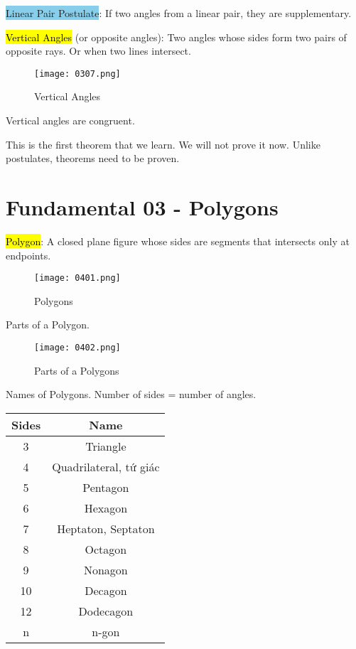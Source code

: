 \begin{tcolorbox}[colback=RoyalPurple!5!white,colframe=RoyalPurple!75!black]
  \colorbox{SkyBlue}{Linear Pair Postulate}: If two angles from a linear pair, they are supplementary.
\end{tcolorbox}

\vspace{1 cm}

\hl{Vertical Angles} (or opposite angles): Two angles whose sides form two pairs of opposite rays. Or when two lines intersect.

\begin{figure}[htb!]
  \centering
  \texttt{[image: 0307.png]}
  \caption{Vertical Angles}
\end{figure}

\begin{tcolorbox}[colback=red!5!white,colframe=red!75!black,title=Vertical Angles Theorem]
  Vertical angles are congruent.
\end{tcolorbox}

This is the first theorem that we learn. We will not prove it now. Unlike postulates, theorems need to be proven.

\section{Fundamental 03 - Polygons}

\newpage

\hl{Polygon}: A closed plane figure whose sides are segments that intersects only at endpoints.

\begin{figure}[htb!]
  \centering
  \texttt{[image: 0401.png]}
  \caption{Polygons}
\end{figure}

Parts of a Polygon.

\begin{figure}[htb!]
  \centering
  \texttt{[image: 0402.png]}
  \caption{Parts of a Polygons}
\end{figure}

\newpage

Names of Polygons. Number of sides = number of angles.

\begin{center}
\begin{tabular}{ c | c }
  \textbf{Sides} & \textbf{Name} \\
  \hline
  3 & Triangle \\
  4 & Quadrilateral, tứ giác \\
  5 & Pentagon \\
  6 & Hexagon \\
  7 & Heptaton, Septaton \\
  8 & Octagon \\
  9 & Nonagon \\
  10 & Decagon \\
  12 & Dodecagon \\
  n & n-gon \\
\end{tabular}
\end{center}

